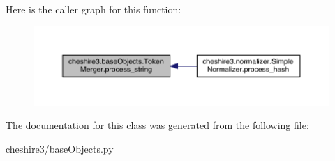 Here is the caller graph for this function\-:
\nopagebreak
\begin{figure}[H]
\begin{center}
\leavevmode
\includegraphics[width=350pt]{classcheshire3_1_1base_objects_1_1_token_merger_a19f86160d5092fd1e6757732645daa33_icgraph}
\end{center}
\end{figure}




The documentation for this class was generated from the following file\-:\begin{DoxyCompactItemize}
\item 
cheshire3/base\-Objects.\-py\end{DoxyCompactItemize}
